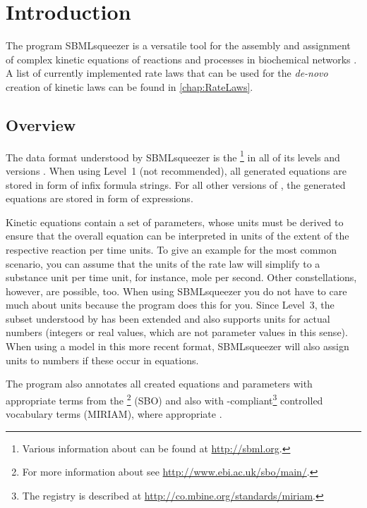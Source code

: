 \chapter{Introduction}

The program SBMLsqueezer is a versatile tool for the assembly and assignment of
complex kinetic equations of reactions and processes in biochemical networks
\citep{Draeger2008, Draeger2010a, Draeger2011a}.
A list of currently implemented rate laws that can be used for the \emph{de-novo}
creation of kinetic laws can be found in \vref{chap:RateLaws}.

\section{Overview}

The data format understood by SBMLsqueezer is the
\SBML\footnote{Various information about \SBML can be found at \url{http://sbml.org}.}
in all of its levels and versions \citep{Hucka2001, Hucka2003, M.Hucka03012003, Hucka2007, Hucka2008,
Hucka2010a, Finney2003, Finney2006}.
When using \SBML Level~1 (not recommended), all generated equations are stored
in form of infix formula strings. For all other versions of \SBML, the generated
equations are stored in form of \MathML \citep{Buswell1999} expressions.

Kinetic equations contain a set of parameters, whose units must be derived to
ensure that the overall equation can be interpreted in units of the extent of the
respective reaction per time units.
To give an example for the most common scenario, you can assume that the units
of the rate law will simplify to a substance unit per time unit, for instance,
mole per second.
Other constellations, however, are possible, too.
When using SBMLsqueezer you do not have to care much about units because the
program does this for you.
Since Level~3, the \MathML subset understood by \SBML has been extended and also supports
units for actual numbers (integers or real values, which are not parameter values in this sense).
When using a model in this more recent format, SBMLsqueezer will also assign units
to numbers if these occur in equations.

The program also annotates all created equations and parameters with appropriate
terms from the \SBO\footnote{For more information about \SBO see \url{http://www.ebi.ac.uk/sbo/main/}.}
(\acl{SBO}) and also
with \MIRIAM-compliant\footnote{The \MIRIAM registry is described at \url{http://co.mbine.org/standards/miriam}.}
controlled vocabulary terms (\acl{MIRIAM}), where appropriate \citep{Le2005, Novere2006b, Laible2007, Courtot2011}.

